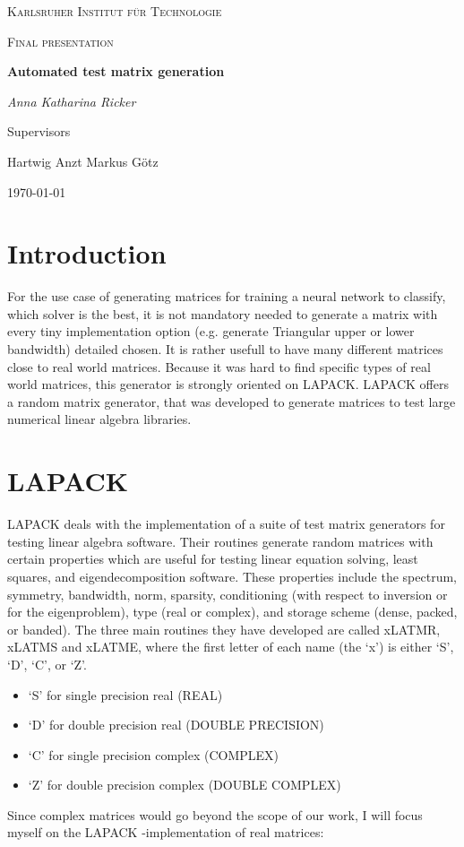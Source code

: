 \documentclass[a4paper]{article}
\begin{document}
	
	\begin{titlepage}
		\centering
		{\scshape\LARGE Karlsruher Institut für Technologie\par}
		\vspace{1cm}
		{\scshape\Large Final presentation\par}
		\vspace{1.5cm}
		{\huge\bfseries Automated test matrix generation\par}
		\vspace {2cm}
		
		{\Large\itshape Anna Katharina Ricker\par}
		
		\vfill
		Supervisors\par
		Hartwig Anzt
		Markus G\"{o}tz
		
		\vfill
		{\large\today\par}
	\end{titlepage}
	
	\tableofcontents
	\newpage
	
\section{Introduction}	
For the use case of generating matrices for training a neural network to classify, which solver is the best, it is not mandatory needed to generate a matrix with every tiny implementation option (e.g. generate Triangular upper or lower bandwidth) detailed chosen. 
It is rather usefull to have many different matrices close to real world matrices. Because it was hard to find specific types of real world matrices, this generator is strongly oriented on LAPACK. LAPACK  offers a random matrix generator, that was developed to generate matrices to test large numerical linear algebra libraries. 

\section{LAPACK}
LAPACK deals with the implementation of a suite of test matrix generators for testing linear algebra software. Their routines generate random matrices with certain properties which are useful for testing linear equation solving, least squares, and eigendecomposition software. These properties include the spectrum, symmetry, bandwidth, norm, sparsity, conditioning  (with respect to inversion or for the eigenproblem), type (real or complex), and storage scheme (dense, packed, or banded).
The three main routines they have developed are called xLATMR, xLATMS and xLATME, where the first letter of each name (the `x') is either `S', `D', `C', or `Z'. 
\begin{itemize}
\item ‘S’ for single precision real (REAL)
\item ‘D’ for double precision real (DOUBLE PRECISION)
\item ‘C’ for single precision complex (COMPLEX)
\item ‘Z’ for double precision complex (DOUBLE COMPLEX)
\end{itemize}
Since complex matrices would go beyond the scope of our work, I will focus myself on the LAPACK -implementation of real matrices:
\end{document}
